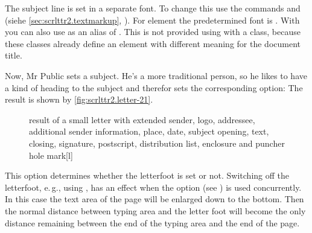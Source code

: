 %
%
The subject line is set in a separate font. To change this
use the commands  and  (siehe
\autoref{sec:scrlttr2.textmarkup},
). For element
 the
predetermined font is . With
 you can also use
 as an alias of
. This is not provided using 
with a \KOMAScript{} class, because these classes already define an element
 with different meaning for the document title.%
%
%
\begin{Example}
  Now, Mr Public sets a subject. He's a more traditional person, so he likes
  to have a kind of heading to the subject and therefor sets the corresponding
  option:%
  The result is shown by \autoref{fig:scrlttr2.letter-21}.
  \begin{figure}
    \setcapindent{0pt}%
    \begin{captionbeside}
      {result of a small letter with extended sender, logo, addressee,
        additional sender information, place, date, subject opening, text,
        closing, signature, postscript, distribution list, enclosure and
        puncher hole mark}[l]
    \end{captionbeside}
    \label{fig:scrlttr2.letter-21}
  \end{figure}
\end{Example}
%
\EndIndexGroup


\begin{Declaration}
\end{Declaration}
%
%
This option determines whether the
letterfoot is set or not. Switching off the letterfoot, e.\,g., using
, has
an effect when the option  (see
) is used concurrently. In
this case the text area of the page will be enlarged down to the bottom. Then
the normal distance between typing area and the letter foot will become the
only distance remaining between the end of the typing area and the end of
the page.

